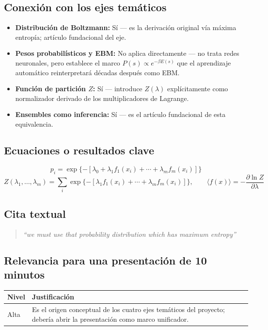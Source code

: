 \documentclass[12pt]{article}
\begin{document}
\subsection*{Conexión con los ejes temáticos}
\begin{itemize}
  \item \textbf{Distribución de Boltzmann:} Sí --- es la derivación original vía máxima entropía; artículo fundacional del eje.
  \item \textbf{Pesos probabilísticos y EBM:} No aplica directamente --- no trata redes neuronales, pero establece el marco $P(s) \propto e^{-\beta E(s)}$ que el aprendizaje automático reinterpretará décadas después como EBM.
  \item \textbf{Función de partición $Z$:} Sí --- introduce $Z(\lambda)$ explícitamente como normalizador derivado de los multiplicadores de Lagrange.
  \item \textbf{Ensembles como inferencia:} Sí --- es el artículo fundacional de esta equivalencia.
\end{itemize}

\subsection*{Ecuaciones o resultados clave}
\begin{equation}
p_i = \exp\{-[\lambda_0+\lambda_1 f_1(x_i)+\cdots+\lambda_m f_m(x_i)]\}
\end{equation}
\begin{equation}
Z(\lambda_1,\ldots,\lambda_m) = \sum_i \exp\{-[\lambda_1 f_1(x_i)+\cdots+\lambda_m f_m(x_i)]\}, \qquad
\langle f(x)\rangle = -\frac{\partial \ln Z}{\partial \lambda}
\end{equation}

\subsection*{Cita textual}
\begin{quote}
\textit{``we must use that probability distribution which has maximum entropy''}
\end{quote}

\subsection*{Relevancia para una presentación de 10 minutos}
\begin{tabular}{@{}p{2cm}p{11.5cm}@{}}
\toprule
\textbf{Nivel} & \textbf{Justificación} \\
\midrule
Alta & Es el origen conceptual de los cuatro ejes temáticos del proyecto; debería abrir la presentación como marco unificador. \\
\bottomrule
\end{tabular}
\end{document}
